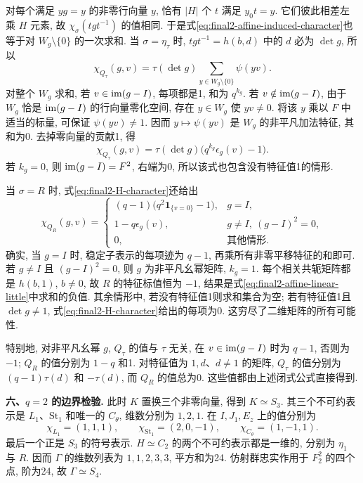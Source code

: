 \begin{solution}
对每个满足 $yg=y$ 的非零行向量 $y$, 恰有 $|H|$ 个 $t$ 满足 $y_0t=y$. 它们彼此相差左乘 $H$ 元素, 故 $\chi_\sigma(tgt^{-1})$ 的值相同. 于是式\eqref{eq:final2-affine-induced-character}也等于对 $W_g\setminus\{0\}$ 的一次求和. 当 $\sigma=\eta_\tau$ 时, $tgt^{-1}=h(b,d)$ 中的 $d$ 必为 $\det g$, 所以
\[
 \chi_{Q_\tau}(g,v)
 =\tau(\det g)\sum_{y\in W_g\setminus\{0\}}\psi(yv).
\]
对整个 $W_g$ 求和, 若 $v\in\operatorname{im}(g-I)$, 每项都是1, 和为 $q^{k_g}$. 若 $v\notin\operatorname{im}(g-I)$, 由于 $W_g$ 恰是 $\operatorname{im}(g-I)$ 的行向量零化空间, 存在 $y\in W_g$ 使 $yv\ne0$. 将该 $y$ 乘以 $F$ 中适当的标量, 可保证 $\psi(yv)\ne1$. 因而 $y\mapsto\psi(yv)$ 是 $W_g$ 的非平凡加法特征, 其和为0. 去掉零向量的贡献1, 得
\begin{equation}\label{eq:final2-affine-linear-little}
 \chi_{Q_\tau}(g,v)
 =\tau(\det g)\bigl(q^{k_g}\epsilon_g(v)-1\bigr).
\end{equation}
若 $k_g=0$, 则 $\operatorname{im}(g-I)=F^2$, 右端为0, 所以该式也包含没有特征值1的情形.

当 $\sigma=R$ 时, 式\eqref{eq:final2-H-character}还给出
\begin{equation}\label{eq:final2-affine-nonlinear-little}
 \chi_{Q_R}(g,v)=
 \begin{cases}
 (q-1)\bigl(q^2\mathbf1_{\{v=0\}}-1\bigr),&g=I,\\
 1-q\epsilon_g(v),&g\ne I,\ (g-I)^2=0,\\
 0,&\text{其他情形}.
 \end{cases}
\end{equation}
确实, 当 $g=I$ 时, 稳定子表示的每项迹为 $q-1$, 再乘所有非零平移特征的和即可. 若 $g\ne I$ 且 $(g-I)^2=0$, 则 $g$ 为非平凡幺幂矩阵, $k_g=1$. 每个相关共轭矩阵都是 $h(b,1)$, $b\ne0$, 故 $R$ 的特征标值恒为 $-1$, 结果是式\eqref{eq:final2-affine-linear-little}中求和的负值. 其余情形中, 若没有特征值1则求和集合为空; 若有特征值1且 $\det g\ne1$, 式\eqref{eq:final2-H-character}给出的每项为0. 这穷尽了二维矩阵的所有可能性.

特别地, 对非平凡幺幂 $g$, $Q_\tau$ 的值与 $\tau$ 无关, 在 $v\in\operatorname{im}(g-I)$ 时为 $q-1$, 否则为 $-1$; $Q_R$ 的值分别为 $1-q$ 和1. 对特征值为 $1,d$、$d\ne1$ 的矩阵, $Q_\tau$ 的值分别为 $(q-1)\tau(d)$ 和 $-\tau(d)$, 而 $Q_R$ 的值总为0. 这些值都由上述闭式公式直接得到.

\textbf{六、$q=2$ 的边界检验.}
此时 $K$ 置换三个非零向量, 得到 $K\simeq S_3$. 其三个不可约表示是 $L_1$、$\mathrm{St}_1$ 和唯一的 $C_\theta$, 维数分别为 $1,2,1$. 在 $I,J_1,E_z$ 上的值分别为
\[
 \chi_{L_1}=(1,1,1),\qquad
 \chi_{\mathrm{St}_1}=(2,0,-1),\qquad
 \chi_{C_\theta}=(1,-1,1).
\]
最后一个正是 $S_3$ 的符号表示. $H\simeq C_2$ 的两个不可约表示都是一维的, 分别为 $\eta_1$ 与 $R$. 因而 $\Gamma$ 的维数列表为 $1,1,2,3,3$, 平方和为24. 仿射群忠实作用于 $F_2^2$ 的四个点, 阶为24, 故 $\Gamma\simeq S_4$.


\end{solution}
